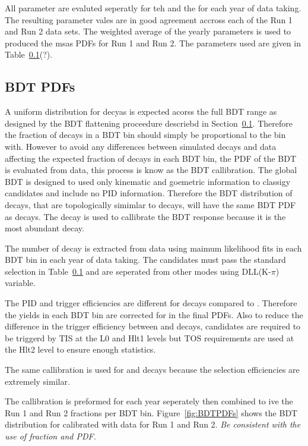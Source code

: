 All parameter are evaluted seperatly for teh \bd and the \bs for each year of data taking. The resulting parameter vales are in good agreement accross each of the Run 1 and Run 2 data sets. The weighted average of the yearly parameters is used to produced the msas PDFs for Run 1 and Run 2. The parameters used are given in Table~\ref{}(?).



\subsection{BDT PDFs}
A uniform distribution for \bmumu decyas is expected acorss the full BDT range as designed by the BDT flattening proceedure descriebd in Section~\ref{}. Therefore the fraction of \bmumu decays in a BDT bin should simply be proportional to the bin with. However to avoid any differences between simulated decays and data affecting the expected fraction of \bmumu decays in each BDT bin, the PDF of the BDT is evaluated from data, this process is know as the BDT callibration.
The global BDT is designed to used only kinematic and goemetric information to classigy candidates and include no PID information. Therefore the BDT distribution of \bhh decays, that are topologically simimlar to \bmumu decays, will have the same BDT PDF as \bmumu decays. The \bdkpi decay is used to callibrate the BDT response because it is the most abundant \bhh decay. 

The number of \bdkpi decay is extracted from data using maimum likelihood fits in each BDT bin in each year of data taking. The \bdkpi candidates must pass the standard \bhh selection in Table~\ref{} and are seperated from other \bhh modes using DLL(K-$\pi$) variable. 

The PID and trigger efficiencies are different for \bdkpi decays compared to \bmumu. Therefore the \bdkpi yields in each BDT bin are corrected for in the final PDFs. Also to reduce the difference in the trigger efficiency between \bdkip and \bmumu decays, \bdkpi candidates are required to be triggerd by TIS at the L0 and Hlt1 levels but TOS requirements are used at the Hlt2 level to ensure enough statistics.

The same callibration is used for \bsmumu and \bdmumu decays because the selection efficiencies are extremely similar. 

The callibration is preformed for each year seperately then combined to ive the Run 1 and Run 2 fractions per BDT bin. Figure~\ref{fig:BDTPDFs} shows the BDT distribution for \bsmumu calibrated with \bdkpi data for Run 1 and Run 2. 
{\it Be consistent with the use of fraction and PDF.}

